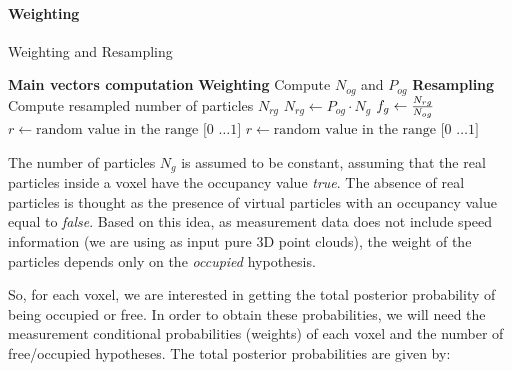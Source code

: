 \paragraph{Weighting}\label{ch:chapter05_01_04_02_02}

\begin{algorithm}[p]
\caption{Weighting and Resampling}
\label{alg:cp05_weighting_resampling}
\begin{algorithmic}
    \State \textbf{Main vectors computation}
      \State {}
    \State
    \State \textbf{Weighting}
      \State \indent Compute $N_{og}$ and $P_{og}$
      \State
    \State \textbf{Resampling}
      \State \indent Compute resampled number of particles $N_{rg}$
      \State \indent $N_{rg} \gets P_{og} \cdot N_g$
      \State \indent $f_g \gets {{N_{rg}} \over {N_{og}}}$
      \State {}
	 
	 
	\EndFor
	\State $r \gets \text{random value in the range [0 \ldots 1]}$
	\EndIf
      \State {}
      \Else 
	\State $r \gets \text{random value in the range [0 \ldots 1]}$
	\EndIf
      \EndIf
    \EndFor
  \EndFor
\EndFunction
\end{algorithmic}
\end{algorithm}

The number of particles $N_g$ is assumed to be constant, assuming that the real particles inside a voxel have the occupancy value \emph{true}. The absence of real particles is thought as the presence of virtual particles with an occupancy value equal to \emph{false}. Based on this idea, as measurement data does not include speed information (we are using as input pure 3D point clouds), the weight of the particles depends only on the \emph{occupied} hypothesis.

So, for each voxel, we are interested in getting the total posterior probability of being occupied or free. In order to obtain these probabilities, we will need the measurement conditional probabilities (weights) of each voxel and the number of free/occupied hypotheses. The total posterior probabilities are given by:

